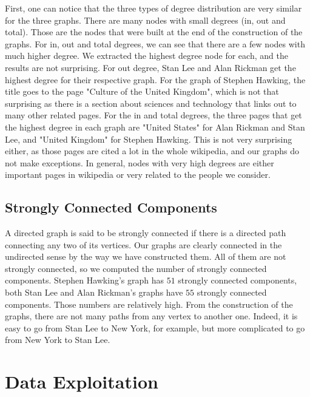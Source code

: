 \documentclass[conference]{IEEEtran}
\begin{document}
First, one can notice that the three types of degree distribution are very similar for the three graphs. There are many nodes with small degrees (in, out and total). Those are the nodes that were built at the end of the construction of the graphs. For in, out and total degrees, we can see that there are a few nodes with much higher degree. We extracted the highest degree node for each, and the results are not surprising. For out degree, Stan Lee and Alan Rickman get the highest degree for their respective graph. For the graph of Stephen Hawking, the title goes to the page "Culture of the United Kingdom", which is not that surprising as there is a section about sciences and technology that links out to many other related pages. For the in and total degrees, the three pages that get the highest degree in each graph are "United States" for Alan Rickman and Stan Lee, and "United Kingdom" for Stephen Hawking. This is not very surprising either, as those pages are cited a lot in the whole wikipedia, and our graphs do not make exceptions. In general, nodes with very high degrees are either important pages in wikipedia or very related to the people we consider. 

\subsection{Strongly Connected Components}

A directed graph is said to be strongly connected if there is a directed path connecting any two of its vertices. Our graphs are clearly connected in the undirected sense by the way we have constructed them. All of them are not strongly connected, so we computed the number of strongly connected components. Stephen Hawking's graph has $51$ strongly connected components, both Stan Lee and Alan Rickman's graphs have $55$ strongly connected components. Those numbers are relatively high. From the construction of the graphs, there are not many paths from any vertex to another one. Indeed, it is easy to go from Stan Lee to New York, for example, but more complicated to go from New York to Stan Lee. 

\section{Data Exploitation} \label{exploitation}
\end{document}

